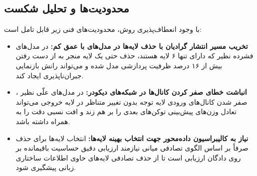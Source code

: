 \subsection{محدودیت‌ها و تحلیل شکست}
با وجود انعطاف‌پذیری روش، محدودیت‌های فنی زیر قابل تامل است:
\begin{itemize}
    \item \textbf{تخریب مسیر انتشار گرادیان با حذف لایه‌ها در مدل‌های با عمق کم:} در مدل‌های فشرده نظیر  که دارای تنها ۶ لایه هستند، حذف حتی یک لایه منجر به از دست رفتن بیش از ۱۶ درصد ظرفیت پردازشی مدل شده و می‌تواند رانش بازنمایی جبران‌ناپذیری ایجاد کند.
    \item \textbf{انباشت خطای صفر کردن کانال‌ها در شبکه‌های دیکودر:} در مدل‌های علّی نظیر ، صفر شدن کانال‌های ورودی لایه توجه بدون تغییر متناظر در لایه خروجی می‌تواند تعادل وزن‌های پیش‌بینی توکن‌های بعدی را بر هم زند و افت نسبی دقت را به همراه داشته باشد.
    \item \textbf{نیاز به کالیبراسیون داده‌محور جهت انتخاب بهینه لایه‌ها:} انتخاب لایه‌ها برای حذف صرفاً بر اساس الگوی تصادفی میانی نیازمند ارزیابی دقیق حساسیت باقیمانده بر روی دادگان ارزیابی است تا از حذف تصادفی لایه‌های حاوی اطلاعات ساختاری زبانی پیشگیری شود.
\end{itemize}
